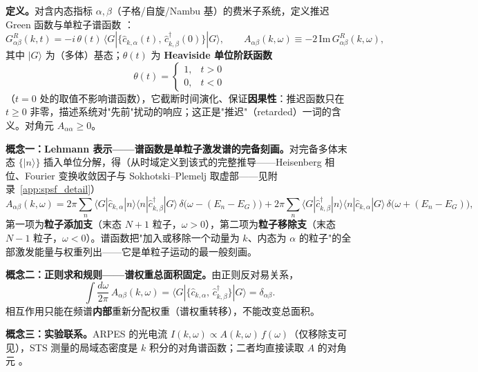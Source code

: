 \documentclass[onecolumn,aps,prl,superscriptaddress,longbibliography]{revtex4-2}
\begin{document}
\textbf{定义。}对含内态指标 $\alpha,\beta$（子格/自旋/Nambu 基）的费米子系统，定义推迟 Green 函数与单粒子谱函数 \cite{estakeRoy2025}：
\begin{equation}\label{eq:green_def}
G^R_{\alpha\beta}(k,t) = -i\,\theta(t)\,\langle G|\{\hat{c}_{k,\alpha}(t),\,\hat{c}^\dagger_{k,\beta}(0)\}|G\rangle,
\qquad
A_{\alpha\beta}(k,\omega) \equiv -2\,\mathrm{Im}\,G^R_{\alpha\beta}(k,\omega),
\end{equation}
其中 $|G\rangle$ 为（多体）基态；$\theta(t)$ 为 \textbf{Heaviside 单位阶跃函数}
\begin{equation}\label{eq:heaviside}
\theta(t) = \begin{cases} 1, & t > 0\\ 0, & t < 0 \end{cases}
\end{equation}
（$t = 0$ 处的取值不影响谱函数），它截断时间演化、保证\textbf{因果性}：推迟函数只在 $t\geq 0$ 非零，描述系统对"先前"扰动的响应；这正是"推迟"（retarded）一词的含义。对角元 $A_{\alpha\alpha} \geq 0$。

\textbf{概念一：Lehmann 表示——谱函数是单粒子激发谱的完备刻画。}对完备多体末态 $\{|n\rangle\}$ 插入单位分解，得（从时域定义到该式的完整推导——Heisenberg 相位、Fourier 变换收敛因子与 Sokhotski--Plemelj 取虚部——见附录~\ref{app:spsf_detail}）
\begin{equation}\label{eq:lehmann_spsf}
A_{\alpha\beta}(k,\omega) = 2\pi\sum_n \langle G|\hat{c}_{k,\alpha}|n\rangle\langle n|\hat{c}^\dagger_{k,\beta}|G\rangle\,\delta\big(\omega - (E_n - E_G)\big)
+ 2\pi\sum_n \langle G|\hat{c}^\dagger_{k,\beta}|n\rangle\langle n|\hat{c}_{k,\alpha}|G\rangle\,\delta\big(\omega + (E_n - E_G)\big),
\end{equation}
第一项为\textbf{粒子添加支}（末态 $N+1$ 粒子，$\omega > 0$），第二项为\textbf{粒子移除支}（末态 $N-1$ 粒子，$\omega < 0$）。谱函数把"加入或移除一个动量为 $k$、内态为 $\alpha$ 的粒子"的全部激发能量与权重列出——它是单粒子运动的最一般刻画。

\textbf{概念二：正则求和规则——谱权重总面积固定。}由正则反对易关系，
\begin{equation}\label{eq:sumrule_spsf}
\int\frac{d\omega}{2\pi}\,A_{\alpha\beta}(k,\omega) = \langle G|\{\hat{c}_{k,\alpha},\,\hat{c}^\dagger_{k,\beta}\}|G\rangle = \delta_{\alpha\beta}.
\end{equation}
相互作用只能在频谱\textbf{内部}重新分配权重（谱权重转移），不能改变总面积。

\textbf{概念三：实验联系。}ARPES 的光电流 $I(k,\omega) \propto A(k,\omega)\,f(\omega)$（仅移除支可见），STS 测量的局域态密度是 $k$ 积分的对角谱函数；二者均直接读取 $A$ 的对角元 \cite{estakeRoy2025}。
\end{document}
